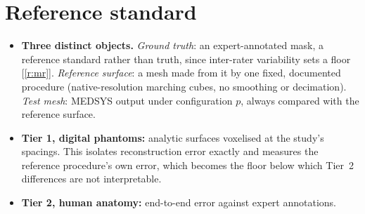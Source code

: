 \documentclass[10pt,a4paper]{article}
\newcommand{\rf}[1]{\ref{#1}}
\begin{document}
\section{Reference standard}
\begin{itemize}
\item \textbf{Three distinct objects.} \emph{Ground truth}: an expert-annotated mask, a reference standard rather than truth, since inter-rater variability sets a floor [\rf{r:mr}]. \emph{Reference surface}: a mesh made from it by one fixed, documented procedure (native-resolution marching cubes, no smoothing or decimation). \emph{Test mesh}: MEDSYS output under configuration $p$, always compared with the reference surface.
\item \textbf{Tier 1, digital phantoms:} analytic surfaces voxelised at the study's spacings. This isolates reconstruction error exactly and measures the reference procedure's own error, which becomes the floor below which Tier~2 differences are not interpretable.
\item \textbf{Tier 2, human anatomy:} end-to-end error against expert annotations.
\end{itemize}
\end{document}

